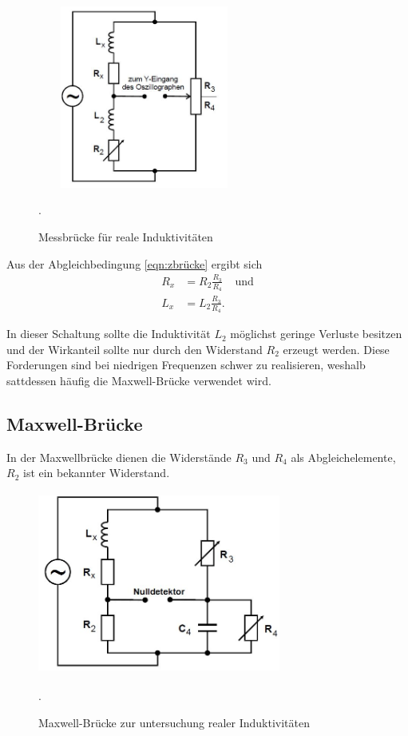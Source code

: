 \begin{figure}[H]
  \centering
  \includegraphics[width=7cm,height=6cm]{induktivitat.JPG}
  \caption{Messbrücke für reale Induktivitäten}
  \label{fig:induktivitat}
  \cite{skript}.
\end{figure}
\noindent Aus der Abgleichbedingung \ref{eqn:zbrücke} ergibt sich
\begin{align}
  R_{x} &=R_{2}\frac{R_{3}}{R_{4}} \;\;\;\; \text{und} \\
  L_{x} &=L_{2}\frac{R_{3}}{R_{4}}.
  \label{eqn:lx}
\end{align}

\noindent In dieser Schaltung sollte die Induktivität $L_{2}$ möglichst geringe
Verluste besitzen und der Wirkanteil sollte nur durch den Widerstand $R_{2}$ erzeugt werden.
Diese Forderungen sind bei niedrigen Frequenzen schwer zu realisieren, weshalb
sattdessen häufig die Maxwell-Brücke verwendet wird.

\subsection{Maxwell-Brücke}
\noindent In der Maxwellbrücke dienen die Widerstände $R_{3}$ und $R_{4}$ als Abgleichelemente,
$R_{2}$ ist ein bekannter Widerstand.

\begin{figure}[H]
  \centering
  \includegraphics[width=8cm,height=6cm]{maxwell.JPG}
  \caption{Maxwell-Brücke zur untersuchung realer Induktivitäten}
  \label{fig:maxwell}
  \cite{skript}.
\end{figure}

